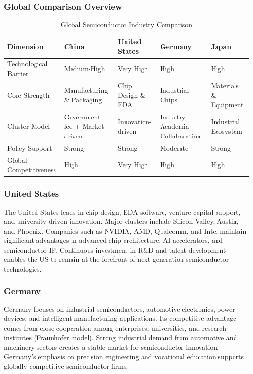 \documentclass[12pt,a4paper]{article}
\newcommand{\tableHeaderRow}{\rowcolor{tealPrimary}\color{white}}
\newcommand{\tableOddRow}{\rowcolor{mintBG}}
\newcommand{\tableEvenRow}{\rowcolor{white}}
\begin{document}
\subsubsection{Global Comparison Overview}

\begin{table}[H]
\centering
\caption{Global Semiconductor Industry Comparison}
\label{tab:global_compare}
\begin{tabular}{p{2.5cm}p{2.8cm}p{2.8cm}p{2.8cm}p{2.8cm}}
\toprule
\tableHeaderRow
\textbf{Dimension} & \textbf{China} & \textbf{United States} & \textbf{Germany} & \textbf{Japan} \\
\midrule
\tableOddRow Technological Barrier & Medium-High & Very High & High & High \\
\tableEvenRow Core Strength & Manufacturing \& Packaging & Chip Design \& EDA & Industrial Chips & Materials \& Equipment \\
\tableOddRow Cluster Model & Government-led + Market-driven & Innovation-driven & Industry-Academia Collaboration & Industrial Ecosystem \\
\tableEvenRow Policy Support & Strong & Strong & Moderate & Strong \\
\tableOddRow Global Competitiveness & High & Very High & High & High \\
\bottomrule
\end{tabular}
\end{table}

\subsubsection{United States}

The United States leads in chip design, EDA software, venture capital
support, and university-driven innovation. Major clusters include
Silicon Valley, Austin, and Phoenix. Companies such as NVIDIA, AMD,
Qualcomm, and Intel maintain significant advantages in advanced chip
architecture, AI accelerators, and semiconductor IP. Continuous
investment in R\&D and talent development enables the US to remain at
the forefront of next-generation semiconductor technologies.

\subsubsection{Germany}

Germany focuses on industrial semiconductors, automotive electronics,
power devices, and intelligent manufacturing applications. Its
competitive advantage comes from close cooperation among enterprises,
universities, and research institutes (Fraunhofer model). Strong
industrial demand from automotive and machinery sectors creates a
stable market for semiconductor innovation. Germany's emphasis on
precision engineering and vocational education supports globally
competitive semiconductor firms.
\end{document}
